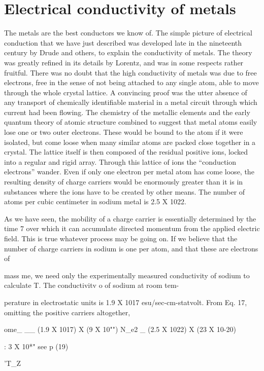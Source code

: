 \section{Electrical conductivity of metals}

The metals are the best conductors we know of. The simple picture
of electrical conduction that we have just described was developed
late in the nineteenth century by Drude and others, to explain
the conductivity of metals. The theory was greatly refined in its details
by Lorentz, and was in some respects rather fruitful. There
was no doubt that the high conductivity of metals was due to
free electrons, free in the sense of not being attached to any single
atom, able to move through the whole crystal lattice. A convincing
proof was the utter absence of any transport of chemically identifiable
material in a metal circuit through which current had been flowing.
The chemistry of the metallic elements and the early quantum theory
of atomic structure combined to suggest that metal atoms easily lose
one or two outer electrons. These would be bound to the atom if it
were isolated, but come loose when many similar atoms are packed
close together in a crystal. The lattice itself is then composed of the
residual positive ions, locked into a regular and rigid array. Through
this lattice of ions the ``conduction electrons'' wander. Even if only
one electron per metal atom has come loose, the resulting density of
charge carriers would be enormously greater than it is in substances
where the ions have to be created by other means. The number of
atoms per cubic centimeter in sodium metal is 2.5 X 1022.

As we have seen, the mobility of a charge carrier is essentially determined
by the time 7 over which it can accumulate directed
momentum from the applied electric field. This is true whatever
process may be going on. If we believe that the number of charge
carriers in sodium is one per atom, and that these are electrons of

mass me, we need only the experimentally measured conductivity of
sodium to calculate T. The conductivitv o of sodium at room tem-

perature in electrostatic units is 1.9 X 1017 esu/sec-cm-statvolt.
From Eq. 17, omitting the positive carriers altogether,

ome_ __ (1.9 X 1017) X (9 X 10"")
N_e2 _ (2.5 X 1022) X (23 X 10-20)

: 3 X 10*" see p (19)

'T_Z
\begin{equation}
\end{equation}

